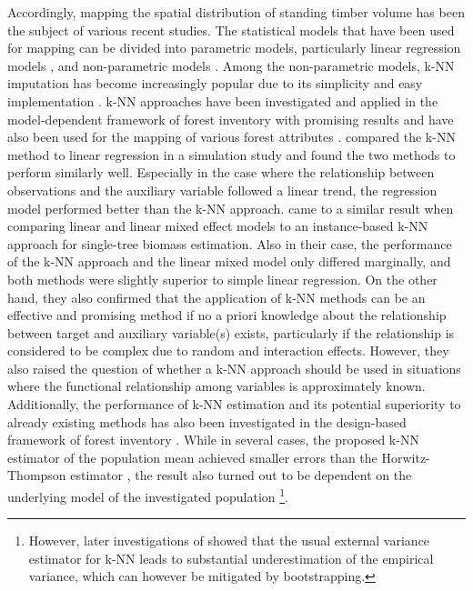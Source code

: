 Accordingly, mapping the spatial distribution of standing timber volume has been the subject of various recent studies. The statistical models that have been used for mapping can be divided into parametric models, particularly linear regression models \citep{tonolli2011, vanaardt2008}, and non-parametric models \citep{franco2001, latifi2010, nothdurft2009}. Among the non-parametric models, k-NN imputation has become increasingly popular due to its simplicity and easy implementation \citep{magnussen2014}. k-NN approaches have been investigated and applied in the model-dependent framework of forest inventory with promising results \citep{mcroberts2007} and have also been used for the mapping of various forest attributes \citep{beaudoin2014, chirici2012, tomppo2006}. \citet{haara2012} compared the k-NN method to linear regression in a simulation study and found the two methods to perform similarly well. Especially in the case where the relationship between observations and the auxiliary variable followed a linear trend, the regression model performed better than the k-NN approach. \citet{fehrmann2008} came to a similar result when comparing linear and linear mixed effect models to an instance-based k-NN approach for single-tree biomass estimation. Also in their case, the performance of the k-NN approach and the linear mixed model only differed marginally, and both methods were slightly superior to simple linear regression. On the other hand, they also confirmed that the application of k-NN methods can be an effective and promising method if no a priori knowledge about the relationship between target and auxiliary variable(s) exists, particularly if the relationship is considered to be complex due to random and interaction effects. However, they also raised the question of whether a k-NN approach should be used in situations where the functional relationship among variables is approximately known. Additionally, the performance of k-NN estimation and its potential superiority to already existing methods has also been investigated in the design-based framework of forest inventory \citep{baffetta2010, baffetta2009}. While in several cases, the proposed k-NN estimator of the population mean achieved smaller errors than the Horwitz-Thompson estimator \citep{mandallaz2008}, the result also turned out to be dependent on the underlying model of the investigated population \footnote{However, later investigations of \citet{massey2015a} showed that the usual external variance estimator for k-NN leads to substantial underestimation of the empirical variance, which can however be mitigated by bootstrapping.}.\par

